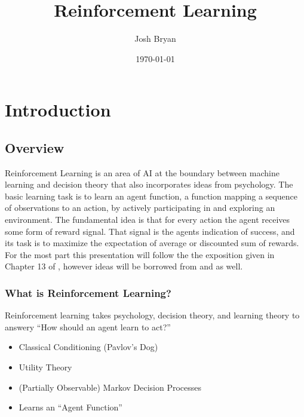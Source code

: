 \documentclass[ignorenonframetext]{beamer}
\title{Reinforcement Learning}
\author{Josh Bryan}
\institute{University of Illinois at Chicago, MCS 548}
\date{\today}
\begin{document}
\maketitle

\section{Introduction}


\subsection{Overview}

	Reinforcement Learning is an area of AI at the boundary between machine
	learning and decision theory that also incorporates ideas from
	psychology.  The basic learning task is to learn an agent function,
	a function mapping a sequence of observations to an action, by
	actively participating in and exploring an environment.  The
	fundamental idea is that for every action the agent receives some form of
	reward signal.  That signal is the agents indication of success, and
	its task is to maximize the expectation of average or discounted sum
	of rewards.  For the most part this presentation will follow the
	the exposition given in Chapter 13 of \cite{mitchell_machine_1997},
	however ideas will be borrowed from
	\cite{kaelbling_reinforcement_1996} and
	\cite{russell_artificial_2010} as well.  

\begin{frame}
	\frametitle{What is Reinforcement Learning?}
	\begin{block}{}
		Reinforcement learning takes psychology, decision theory, and
		learning theory to answery ``How should an agent learn to act?''
	\end{block}
	\begin{itemize}
		\item Classical Conditioning (Pavlov's Dog)
		\item Utility Theory
		\item (Partially Observable) Markov Decision Processes
		\item Learns an ``Agent Function''
	\end{itemize}
\end{frame}
\end{document}
